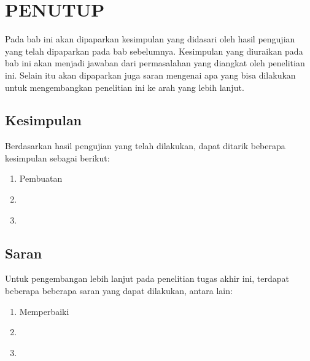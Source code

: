 \chapter{PENUTUP}
\label{chap:penutup}

Pada bab ini akan dipaparkan kesimpulan yang didasari oleh hasil pengujian yang telah dipaparkan pada bab sebelumnya.
Kesimpulan yang diuraikan pada bab ini akan menjadi jawaban dari permasalahan yang diangkat oleh penelitian ini.
Selain itu akan dipaparkan juga saran mengenai apa yang bisa dilakukan untuk mengembangkan penelitian ini ke arah yang lebih lanjut.

\section{Kesimpulan}
\label{sec:kesimpulan}

Berdasarkan hasil pengujian yang telah dilakukan, dapat ditarik beberapa kesimpulan sebagai berikut:

\begin{enumerate}[nolistsep]

  \item Pembuatan \textcolor{red}{\lipsum[2][1-3]}

  \item \textcolor{red}{\lipsum[2][4-6]}

  \item \textcolor{red}{\lipsum[2][7-10]}

\end{enumerate}

\section{Saran}
\label{chap:saran}

Untuk pengembangan lebih lanjut pada penelitian tugas akhir ini, terdapat beberapa beberapa saran yang dapat dilakukan, antara lain:

\begin{enumerate}[nolistsep]

  \item Memperbaiki \textcolor{red}{\lipsum[2][1-3]}

  \item \textcolor{red}{\lipsum[2][4-6]}

  \item \textcolor{red}{\lipsum[2][7-10]}

\end{enumerate}
